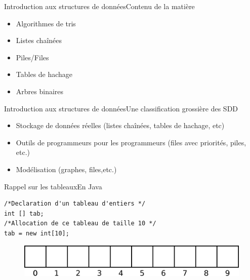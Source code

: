 \documentclass[12pt,a4paper,handout]{beamer}
\begin{document}
%
%
%




\begin{frame}{Introduction aux structures de données}{Contenu de la matière}
\begin{itemize}
\item Algorithmes de tris
\item Listes chaînées
\item Piles/Files
\item Tables de hachage
\item Arbres binaires
\end{itemize}
\end{frame}


\begin{frame}{Introduction aux structures de données}{Une classification grossière des SDD}
\begin{itemize}
\item Stockage de données réelles (listes chaînées, tables de hachage, etc)
\item Outils de programmeurs pour les programmeurs (files avec priorités, piles, etc.)
\item Modélisation (graphes, files,etc.)
\end{itemize}
\end{frame}



\begin{frame}[fragile]{Rappel sur les tableaux}{En Java}

\begin{lstlisting}
/*Declaration d'un tableau d'entiers */
int [] tab;
/*Allocation de ce tableau de taille 10 */
tab = new int[10];
\end{lstlisting}

\begin{figure}
\centering
\includegraphics[scale=0.3]{figs/array_empty}
\end{figure}

\end{frame}
\end{document}
